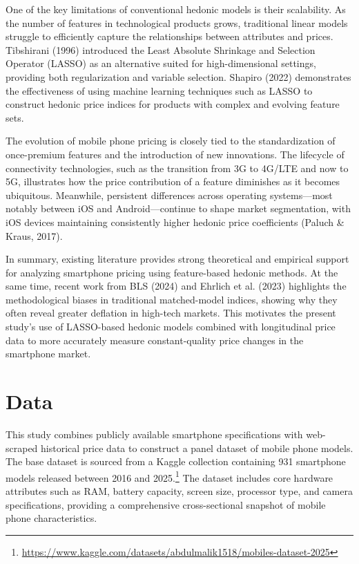 \documentclass[12pt]{article}
\begin{document}
One of the key limitations of conventional hedonic models is their scalability. As the number of features in technological products grows, traditional linear models struggle to efficiently capture the relationships between attributes and prices. Tibshirani (1996) introduced the Least Absolute Shrinkage and Selection Operator (LASSO) as an alternative suited for high-dimensional settings, providing both regularization and variable selection. Shapiro (2022) demonstrates the effectiveness of using machine learning techniques such as LASSO to construct hedonic price indices for products with complex and evolving feature sets.

The evolution of mobile phone pricing is closely tied to the standardization of once-premium features and the introduction of new innovations. The lifecycle of connectivity technologies, such as the transition from 3G to 4G/LTE and now to 5G, illustrates how the price contribution of a feature diminishes as it becomes ubiquitous. Meanwhile, persistent differences across operating systems—most notably between iOS and Android—continue to shape market segmentation, with iOS devices maintaining consistently higher hedonic price coefficients (Paluch \& Kraus, 2017).

In summary, existing literature provides strong theoretical and empirical support for analyzing smartphone pricing using feature-based hedonic methods. At the same time, recent work from BLS (2024) and Ehrlich et al. (2023) highlights the methodological biases in traditional matched-model indices, showing why they often reveal greater deflation in high-tech markets. This motivates the present study's use of LASSO-based hedonic models combined with longitudinal price data to more accurately measure constant-quality price changes in the smartphone market.

\section{Data}

This study combines publicly available smartphone specifications with web-scraped historical price data to construct a panel dataset of mobile phone models. The base dataset is sourced from a Kaggle collection containing 931 smartphone models released between 2016 and 2025.\footnote{\url{https://www.kaggle.com/datasets/abdulmalik1518/mobiles-dataset-2025}} The dataset includes core hardware attributes such as RAM, battery capacity, screen size, processor type, and camera specifications, providing a comprehensive cross-sectional snapshot of mobile phone characteristics.
\end{document}
